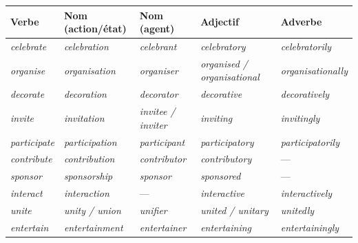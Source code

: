 \documentclass[11pt]{article}
\newcommand{\eng}[1]{\ifmmode\text{\textit{#1}}\else\begingroup\selectlanguage{english}\itshape #1\endgroup\fi}
\begin{document}
\begin{propriete}
\begin{center}
\begin{tabular}{|l|l|l|l|l|}\hline
\rowcolor{poppurpleL} \textbf{Verbe} & \textbf{Nom (action/état)} & \textbf{Nom (agent)} & \textbf{Adjectif} & \textbf{Adverbe} \\ \hline
\eng{celebrate} & \eng{celebration} & \eng{celebrant} & \eng{celebratory} & \eng{celebratorily} \\ \hline
\eng{organise} & \eng{organisation} & \eng{organiser} & \eng{organised / organisational} & \eng{organisationally} \\ \hline
\eng{decorate} & \eng{decoration} & \eng{decorator} & \eng{decorative} & \eng{decoratively} \\ \hline
\eng{invite} & \eng{invitation} & \eng{invitee / inviter} & \eng{inviting} & \eng{invitingly} \\ \hline
\eng{participate} & \eng{participation} & \eng{participant} & \eng{participatory} & \eng{participatorily} \\ \hline
\eng{contribute} & \eng{contribution} & \eng{contributor} & \eng{contributory} & — \\ \hline
\eng{sponsor} & \eng{sponsorship} & \eng{sponsor} & \eng{sponsored} & — \\ \hline
\eng{interact} & \eng{interaction} & — & \eng{interactive} & \eng{interactively} \\ \hline
\eng{unite} & \eng{unity / union} & \eng{unifier} & \eng{united / unitary} & \eng{unitedly} \\ \hline
\eng{entertain} & \eng{entertainment} & \eng{entertainer} & \eng{entertaining} & \eng{entertainingly} \\ \hline
\end{tabular}
\end{center}
\end{propriete}
\end{document}
